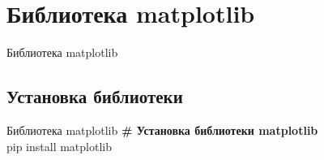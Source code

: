 \documentclass[12pt]{beamer}
\begin{document}
\section{Библиотека matplotlib}
\begin{frame}{Библиотека matplotlib}
 \\
\vspace{0.3cm}
\href{https://matplotlib.org/}{}
\end{frame}

\subsection{Установка библиотеки}
\begin{frame}{Библиотека matplotlib}
\textbf{\# Установка библиотеки matplotlib} \\
\vspace{0.5cm}
pip install matplotlib
\end{frame}
\end{document}
